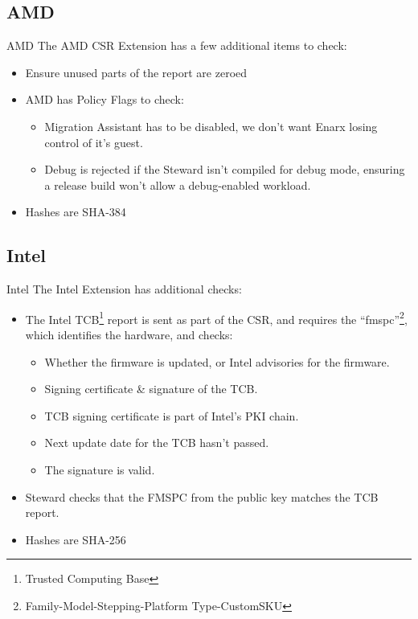 \documentclass[graphics,compress]{beamer}
\begin{document}
\subsection{AMD}
\begin{frame}{AMD}
The AMD CSR Extension has a few additional items to check:
\begin{itemize}
    \item Ensure unused parts of the report are zeroed
    \item AMD has Policy Flags to check:
    \begin{itemize}
        \item Migration Assistant has to be disabled, we don't want Enarx losing control of it's guest.
        \item Debug is rejected if the Steward isn't compiled for debug mode, ensuring a release build won't allow a debug-enabled workload.
    \end{itemize}
    \item Hashes are SHA-384
\end{itemize}
\end{frame}

\subsection{Intel}
\begin{frame}{Intel}
The Intel Extension has additional checks:
\begin{itemize}
    \item The Intel TCB\footnote{Trusted Computing Base} report is sent as part of the CSR, and requires the ``fmspc''\footnote{Family-Model-Stepping-Platform Type-CustomSKU}, which identifies the hardware, and checks:
    \begin{itemize}
        \item Whether the firmware is updated, or Intel advisories for the firmware.
        \item Signing certificate \& signature of the TCB.
        \item TCB signing certificate is part of Intel's PKI chain.
        \item Next update date for the TCB hasn't passed.
        \item The signature is valid.
    \end{itemize}
    \item Steward checks that the FMSPC from the public key matches the TCB report.
    \item Hashes are SHA-256
\end{itemize}
\end{frame}
\end{document}
